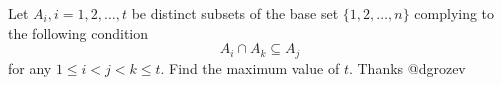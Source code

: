 Let $ A_i,i=1,2,\dots,t$ be distinct subsets of the base set $\{1,2,\dots,n\}$ complying to the following condition
$$ \displaystyle A_ {i} \cap A_ {k} \subseteq A_ {j}$$for any $1 \leq i <j <k \leq t.$ Find the maximum value of $t.$
Thanks @dgrozev